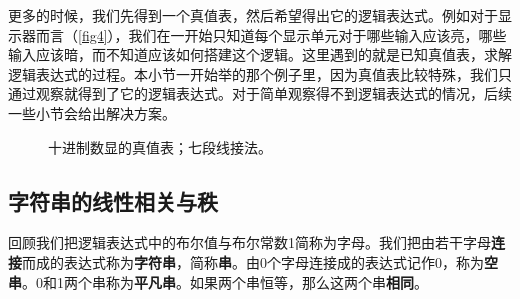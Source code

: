 更多的时候，我们先得到一个真值表，然后希望得出它的逻辑表达式。例如对于显示器而言（\autoref{fig4}），我们在一开始只知道每个显示单元对于哪些输入应该亮，哪些输入应该暗，而不知道应该如何搭建这个逻辑。这里遇到的就是已知真值表，求解逻辑表达式的过程。本小节一开始举的那个例子里，因为真值表比较特殊，我们只通过观察就得到了它的逻辑表达式。对于简单观察得不到逻辑表达式的情况，后续一些小节会给出解决方案。
\begin{figure}[!ht]
\centering
{}\qquad
{}
\caption{\protect{}十进制数显的真值表；\protect{}七段线接法。}\label{fig4}
\end{figure}

\subsection{字符串的线性相关与秩}
回顾我们把逻辑表达式中的布尔值与布尔常数1简称为字母。我们把由若干字母\textbf{连接}而成的表达式称为\textbf{字符串}，简称\textbf{串}。由0个字母连接成的表达式记作0，称为\textbf{空串}。0和1两个串称为\textbf{平凡串}。如果两个串恒等，那么这两个串\textbf{相同}。

